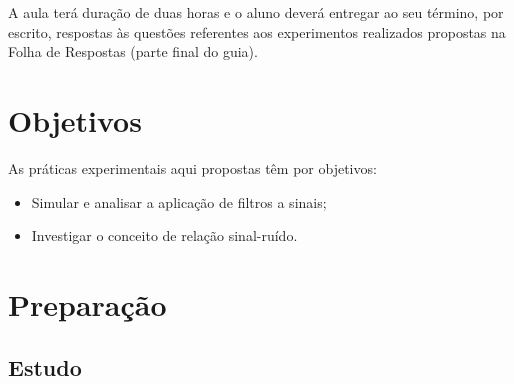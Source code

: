 \documentclass[12pt,addpoints]{exam}
\begin{document}
A aula terá duração de duas horas e o aluno deverá entregar ao seu término, por escrito, respostas às questões referentes aos experimentos realizados propostas na Folha de Respostas (parte final do guia).



\section{Objetivos}

As práticas experimentais aqui propostas têm por objetivos:
\begin{itemize}
    \item Simular e analisar a aplicação de filtros a sinais;
    \item Investigar o conceito de relação sinal-ruído.
\end{itemize}

\section{Preparação} \label{sect:Preparacao}

\subsection{Estudo}
\end{document}
